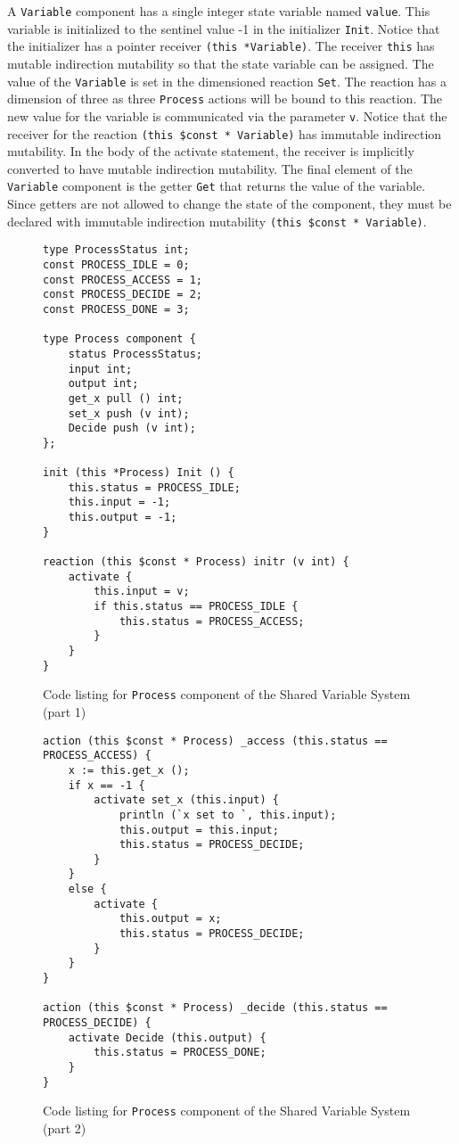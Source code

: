 \clearpage

A \verb+Variable+ component has a single integer state variable named \verb+value+.
This variable is initialized to the sentinel value -1 in the initializer \verb+Init+.
Notice that the initializer has a pointer receiver \verb+(this *Variable)+.
The receiver \verb+this+ has mutable indirection mutability so that the state variable can be assigned.
The value of the \verb+Variable+ is set in the dimensioned reaction \verb+Set+.
The reaction has a dimension of three as three \verb+Process+ actions will be bound to this reaction.
The new value for the variable is communicated via the parameter \verb+v+.
Notice that the receiver for the reaction \verb+(this $const * Variable)+ has immutable indirection mutability.
In the body of the activate statement, the receiver is implicitly converted to have mutable indirection mutability.
The final element of the \verb+Variable+ component is the getter \verb+Get+ that returns the value of the variable.
Since getters are not allowed to change the state of the component, they must be declared with immutable indirection mutability \verb+(this $const * Variable)+.

\begin{figure}
\begin{verbatim}
type ProcessStatus int;
const PROCESS_IDLE = 0;
const PROCESS_ACCESS = 1;
const PROCESS_DECIDE = 2;
const PROCESS_DONE = 3;

type Process component {
    status ProcessStatus;
    input int;
    output int;
    get_x pull () int;
    set_x push (v int);
    Decide push (v int);
};

init (this *Process) Init () {
    this.status = PROCESS_IDLE;
    this.input = -1;
    this.output = -1;
}

reaction (this $const * Process) initr (v int) {
    activate {
        this.input = v;
        if this.status == PROCESS_IDLE {
            this.status = PROCESS_ACCESS;
        }
    }
}
\end{verbatim}
\cprotect\caption{Code listing for \verb+Process+ component of the Shared Variable System (part 1)}
\label{process1}
\end{figure}

\begin{figure}
\begin{verbatim}
action (this $const * Process) _access (this.status == PROCESS_ACCESS) {
    x := this.get_x ();
    if x == -1 {
        activate set_x (this.input) {
            println (`x set to `, this.input);
            this.output = this.input;
            this.status = PROCESS_DECIDE;
        }
    }
    else {
        activate {
            this.output = x;
            this.status = PROCESS_DECIDE;
        }
    }
}

action (this $const * Process) _decide (this.status == PROCESS_DECIDE) {
    activate Decide (this.output) {
        this.status = PROCESS_DONE;
    }
}
\end{verbatim}
\cprotect\caption{Code listing for \verb+Process+ component of the Shared Variable System (part 2)}
\label{process2}
\end{figure}

